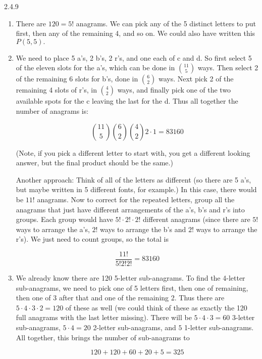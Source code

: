 \documentclass[11pt,]{book}
\theoremstyle{ptxplainnotitle}
\theoremstyle{ptxplaintitle}
\theoremstyle{ptxdefinitionnotitle}
\theoremstyle{ptxdefinitiontitle}
\theoremstyle{ptxdefinitionnotitle}
\theoremstyle{ptxdefinitiontitle}
\theoremstyle{ptxdefinitionnotitle}
\theoremstyle{ptxdefinitiontitle}
\theoremstyle{ptxdefinitiontitlenonumber}
\theoremstyle{ptxdefinitiontitlenonumber}
\numberwithin{equation}{chapter}
\begin{document}
\begin{divisionexercise}{2.4.9}
\textbf{}\hypertarget{p-1621}{}%
\leavevmode%
\begin{enumerate}[label=(\alph*)]
\item\hypertarget{li-682}{}\hypertarget{p-1622}{}%
There are \(120 = 5!\) anagrams.  We can pick any of the 5 distinct letters to put first, then any of the remaining 4, and so on.  We could also have written this \(P(5,5)\text{.}\)%
\item\hypertarget{li-683}{}\hypertarget{p-1623}{}%
We need to place 5 a's, 2 b's, 2 r's, and one each of c and d.  So first select 5 of the eleven slots for the a's, which can be done in \({11 \choose 5}\) ways.  Then select 2 of the remaining 6 slots for b's, done in \({6 \choose 2}\) ways.  Next pick 2 of the remaining 4 slots of r's, in \({4 \choose 2}\) ways, and finally pick one of the two available spots for the c leaving the last for the d.  Thus all together the number of anagrams is:%
\par
\hypertarget{p-1624}{}%
%
\begin{equation*}
{11\choose 5}{6 \choose 2}{4 \choose 2}2\cdot 1 = 83160
\end{equation*}
%
\par
\hypertarget{p-1625}{}%
(Note, if you pick a different letter to start with, you get a different looking answer, but the final product should be the same.)%
\par
\hypertarget{p-1626}{}%
Another approach: Think of all of the letters as different (so there are 5 a's, but maybe written in 5 different fonts, for example.)  In this case, there would be \(11!\) anagrams.  Now to correct for the repeated letters, group all the anagrams that just have different arrangements of the a's, b's and r's into groups.  Each group would have \(5!\cdot 2! \cdot 2!\) different anagrams (since there are \(5!\) ways to arrange the a's, \(2!\) ways to arrange the b's and \(2!\) ways to arrange the r's).  We just need to count groups, so the total is%
\par
\hypertarget{p-1627}{}%
%
\begin{equation*}
\frac{11!}{5!2! 2!} = 83160
\end{equation*}
%
\item\hypertarget{li-684}{}\hypertarget{p-1628}{}%
We already know there are 120 5-letter sub-anagrams.  To find the 4-letter sub-anagrams, we need to pick one of 5 letters first, then one of remaining, then one of 3 after that and one of the remaining 2.  Thus there are \(5\cdot 4 \cdot 3 \cdot 2 = 120\) of these as well (we could think of these as exactly the 120 full anagrams with the last letter missing).  There will be \(5 \cdot 4 \cdot 3 = 60\) 3-letter sub-anagrams, \(5\cdot 4 = 20\) 2-letter sub-anagrams, and \(5\) 1-letter sub-anagrams.  All together, this brings the number of sub-anagrams to%
\par
\hypertarget{p-1629}{}%
%
\begin{equation*}
120 + 120 + 60 + 20 + 5 = 325
\end{equation*}
%
\end{enumerate}
%
\end{divisionexercise}%
\end{document}
